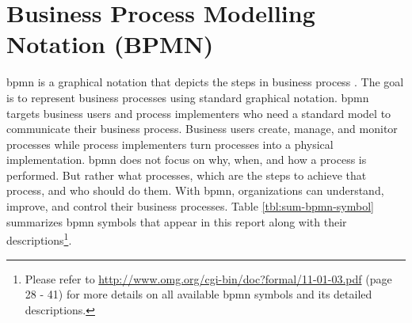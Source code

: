 \section{Business Process Modelling Notation (BPMN)}
\gls{bpmn} is a graphical notation that depicts the steps in business process \cite{bpmn_omg}.
The goal is to represent business processes using standard graphical notation.
\gls{bpmn} targets business users and process implementers who need a standard model to communicate their business process.
Business users create, manage, and monitor processes while process implementers turn processes into a physical implementation. 
\gls{bpmn} does not focus on why, when, and how a process is performed.
But rather what processes, which are the steps to achieve that process, and who should do them.
With \gls{bpmn}, organizations can understand, improve, and control their business processes.
Table \ref{tbl:sum-bpmn-symbol} summarizes \gls{bpmn} symbols that appear in this report along with their descriptions\footnote{Please refer to \url{http://www.omg.org/cgi-bin/doc?formal/11-01-03.pdf} (page 28 - 41) for more details on all available \gls{bpmn} symbols and its detailed descriptions.}.
